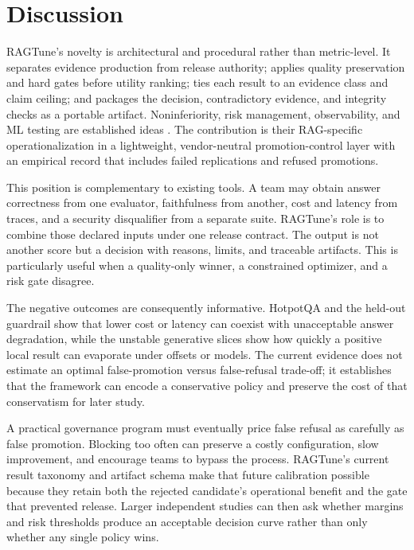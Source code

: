 \documentclass[11pt]{article}
\begin{document}
\section{Discussion}
RAGTune's novelty is architectural and procedural rather than metric-level. It separates evidence production from release authority; applies quality preservation and hard gates before utility ranking; ties each result to an evidence class and claim ceiling; and packages the decision, contradictory evidence, and integrity checks as a portable artifact. Noninferiority, risk management, observability, and ML testing are established ideas \cite{ref11,ref12,ref13,ref14,ref15,ref16,ref17}. The contribution is their RAG-specific operationalization in a lightweight, vendor-neutral promotion-control layer with an empirical record that includes failed replications and refused promotions.

This position is complementary to existing tools. A team may obtain answer correctness from one evaluator, faithfulness from another, cost and latency from traces, and a security disqualifier from a separate suite. RAGTune's role is to combine those declared inputs under one release contract. The output is not another score but a decision with reasons, limits, and traceable artifacts. This is particularly useful when a quality-only winner, a constrained optimizer, and a risk gate disagree.

The negative outcomes are consequently informative. HotpotQA and the held-out guardrail show that lower cost or latency can coexist with unacceptable answer degradation, while the unstable generative slices show how quickly a positive local result can evaporate under offsets or models. The current evidence does not estimate an optimal false-promotion versus false-refusal trade-off; it establishes that the framework can encode a conservative policy and preserve the cost of that conservatism for later study.

A practical governance program must eventually price false refusal as carefully as false promotion. Blocking too often can preserve a costly configuration, slow improvement, and encourage teams to bypass the process. RAGTune's current result taxonomy and artifact schema make that future calibration possible because they retain both the rejected candidate's operational benefit and the gate that prevented release. Larger independent studies can then ask whether margins and risk thresholds produce an acceptable decision curve rather than only whether any single policy wins.
\end{document}
